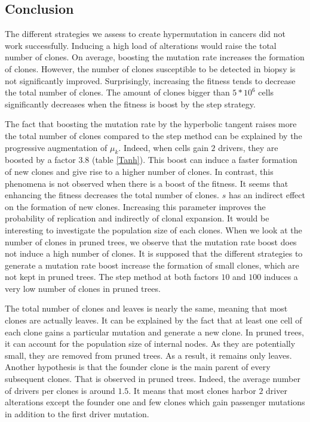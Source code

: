 \documentclass[a4paper]{article}
\begin{document}
\begin{multicols}{2}
\section{Conclusion}
The different strategies we assess to create hypermutation in cancers did not work successfully. Inducing a high load of alterations would raise the total number of clones. On average, boosting the mutation rate increases the formation of clones. However, the number of clones susceptible to be detected in biopsy is not significantly improved. Surprisingly, increasing the fitness tends to decrease the total number of clones. The amount of clones bigger than $5*10^6$ cells significantly decreases when the fitness is boost by the step strategy. 

The fact that boosting the mutation rate by the hyperbolic tangent raises more the total number of clones compared to the step method can be explained by the progressive augmentation of $\mu_k$. Indeed, when cells gain $2$ drivers, they are boosted by a factor $3.8$ (table \ref{Tanh}). This boost can induce a faster formation of new clones and give rise to a higher number of clones. In contrast, this phenomena is not observed when there is a boost of the fitness. It seems that enhancing the fitness decreases the total number of clones. $s$ has an indirect effect on the formation of new clones. Increasing this parameter improves the probability of replication and indirectly of clonal expansion. It would be interesting to investigate the population size of each clones. When we look at the number of clones in pruned trees, we observe that the mutation rate boost does not induce a high number of clones. It is supposed that the different strategies to generate a mutation rate boost increase the formation of small clones, which are not kept in pruned trees. The step method at both factors $10$ and $100$ induces a very low number of clones in pruned trees.  


The total number of clones and leaves is nearly the same, meaning that most clones are actually leaves. It can be explained by the fact that at least one cell of each clone gains a particular mutation and generate a new clone. In pruned trees, it can account for the population size of internal nodes. As they are potentially small, they are removed from pruned trees. As a result, it remains only leaves. Another hypothesis is that the founder clone is the main parent of every subsequent clones. That is observed in pruned trees. Indeed, the average number of drivers per clones is around $1.5$. It means that most clones harbor $2$ driver alterations except the founder one and few clones which gain passenger mutations in addition to the first driver mutation. 


\end{multicols}
\end{document}
